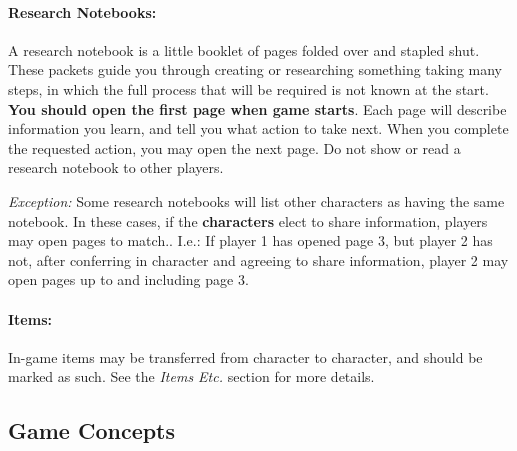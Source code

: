 \documentclass[sheet]{GL2020}
\begin{document}
\paragraph{Research Notebooks:} A research notebook is a little booklet of pages folded over and stapled shut. These packets guide you through creating or researching something taking many steps, in which the full process that will be required is not known at the start. \textbf{You should open the first page when game starts}. Each page will describe information you learn, and tell you what action to take next. When you complete the requested action, you may open the next page. Do not show or read a research notebook to other players. 

\emph{Exception:} Some research notebooks will list other characters as having the same notebook. In these cases, if the \textbf{characters} elect to share information, players may open pages to match.. I.e.: If player 1 has opened page 3, but player 2 has not, after conferring in character and agreeing to share information, player 2 may open pages up to and including page 3.

\paragraph{Items:} In-game items may be transferred from character to character, and should be marked as such.  See the \emph{Items Etc.} section for more details.


\subsection{Game Concepts}

\end{document}
